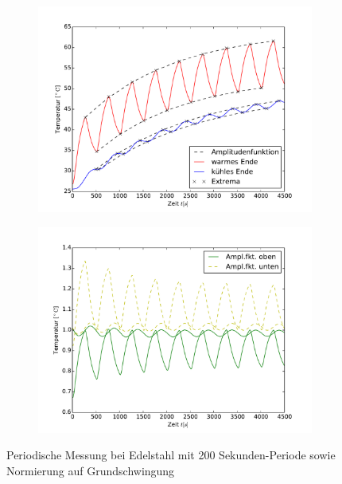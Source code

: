 \begin{figure}[p]
\label{fig:M3Edelstahl}
\centering
	\begin{subfigure}{0.9\textwidth}
	\centering
	\includegraphics[width=\textwidth]{Bilder/M3_Edelstahl.pdf}
	\end{subfigure}
	\begin{subfigure}{0.9\textwidth}
	\centering
	\includegraphics[width=\textwidth]{Bilder/Normierungsauswahl/M3_Edelstahl_norm.pdf}
	\end{subfigure}
\caption{Periodische Messung bei Edelstahl mit 200 Sekunden-Periode sowie Normierung auf Grundschwingung}
\end{figure}
